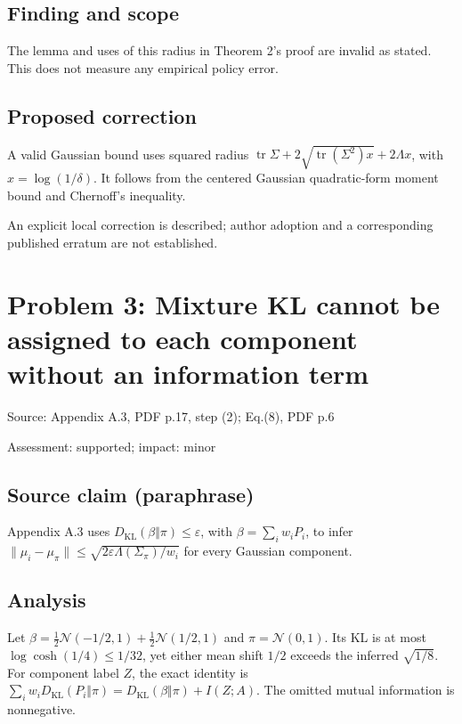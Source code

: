 \documentclass[11pt]{article}
\begin{document}
\subsection*{Finding and scope}

The lemma and uses of this radius in Theorem 2’s proof are invalid as stated. This does not measure any empirical policy error.

\subsection*{Proposed correction}

A valid Gaussian bound uses squared radius \(\operatorname{tr}\Sigma+2\sqrt{\operatorname{tr}(\Sigma^2)x}+2\Lambda x\), with \(x=\log(1/\delta)\). It follows from the centered Gaussian quadratic-form moment bound and Chernoff’s inequality.

An explicit local correction is described; author adoption and a corresponding published erratum are not established.

\section*{Problem 3: Mixture KL cannot be assigned to each component without an information term}

Source: Appendix A.3, PDF p.17, step (2); Eq.(8), PDF p.6

Assessment: supported; impact: minor

\subsection*{Source claim (paraphrase)}

Appendix A.3 uses \(D_{\mathrm{KL}}(\beta\Vert\pi)\leq\varepsilon\), with \(\beta=\sum_iw_iP_i\), to infer \(\|\mu_i-\mu_\pi\|\leq\sqrt{2\varepsilon\Lambda(\Sigma_\pi)/w_i}\) for every Gaussian component.

\subsection*{Analysis}

Let \(\beta=\tfrac12\mathcal N(-1/2,1)+\tfrac12\mathcal N(1/2,1)\) and \(\pi=\mathcal N(0,1)\). Its KL is at most \(\log\cosh(1/4)\leq1/32\), yet either mean shift \(1/2\) exceeds the inferred \(\sqrt{1/8}\). For component label \(Z\), the exact identity is \(\sum_iw_iD_{\mathrm{KL}}(P_i\Vert\pi)=D_{\mathrm{KL}}(\beta\Vert\pi)+I(Z;A)\). The omitted mutual information is nonnegative.
\end{document}
